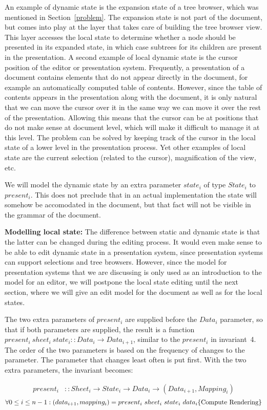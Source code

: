 \documentclass[twoside,epsf]{report}
\begin{document}
An example of dynamic state is the expansion state of a tree browser, which was mentioned in Section~\ref{problem}. The expansion state is not part of the document, but comes into play at the layer that takes care of building the tree browser view. This layer accesses the local state to determine whether a node should be presented in its expanded state, in which case subtrees for its children are present in the presentation. A second example of local dynamic state is the cursor position of the editor or presentation system. Frequently, a presentation of a document contains elements that do not appear directly in the document, for example an automatically computed table of contents. However, since the table of contents appears in the presentation along with the document, it is only natural that we can move the cursor over it in the same way we can move it over the rest of the presentation. Allowing this means that the cursor can be at positions that do not make sense at document level, which will make it difficult to manage it at this level. The problem can be solved by keeping track of the cursor in the local state of a lower level in the presentation process. Yet other examples of local state are the current selection (related to the cursor), magnification of the view, etc.

We will model the dynamic state by an extra parameter $state_i$ of type $State_i$ to $present_i$. This does not preclude that in an actual implementation the state will somehow be accomodated in the document, but that fact will not be visible in the grammar of the document.

{\bf Modelling local state: }The difference between static and dynamic state is that the latter can be changed during the editing process. It would even make sense to be able to edit dynamic state in a presentation system, since presentation systems can support selections and tree browsers. However, since the model for presentation systems that we are discussing is only used as an introduction to the model for an editor, we will postpone the local state editing until the next section, where we will give an edit model for the document as well as for the local states. 

The two extra parameters of $present_i$ are supplied before the $Data_i$ parameter, so that if both parameters are supplied, the result is a function $present_i~sheet_i~state_i :: Data_i \rightarrow Data_{i+1}$, similar to the $present_i$ in invariant~4. The order of the two parameters is based on the frequency of changes to the parameter. The parameter that changes least often is put first. With the two extra parameters, the invariant becomes:\begin{small}\begin{align*} %
present_i & :: Sheet_i \rightarrow State_i \rightarrow Data_i \rightarrow (Data_{i+1}, Mapping_{i})\\
\end{align*}
\begin{math}
\forall 0 \le i \le n-1: \\
(data_{i+1}, mapping_{i}) = present_i~sheet_i~state_i~data_i
\hfill \text{\{Compute Rendering\}}
\end{math}\end{small}
\end{document}
